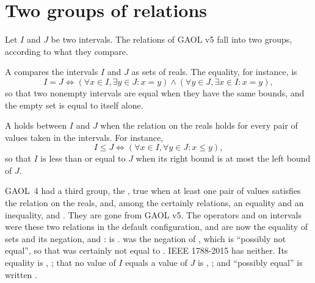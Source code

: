 \section{Two groups of relations}\label{sec:relations-groups}
%

Let $I$ and $J$ be two intervals. The relations of GAOL v5 fall into two
groups, according to what they compare.

\begin{Def}\label{def:relations-set}
A  compares the intervals $I$ and $J$ as sets of reals.
The equality, for instance, is
\begin{equation*}
I=J \Leftrightarrow(\forall x\in I, \exists y\in J\colon x=y)\wedge
                   (\forall y\in J, \exists x\in I\colon x=y),
\end{equation*}
so that two nonempty intervals are equal when they have the same bounds, and
the empty set is equal to itself alone.
\end{Def}

\begin{Def}\label{def:relations-certainly}
A  holds between $I$ and $J$ when the relation on
the reals holds for every pair of values taken in the intervals. For
instance,
\begin{equation*}
I\leq J \Leftrightarrow(\forall x\in I, \forall y\in J\colon x\leq y),
\end{equation*}
so that $I$ is less than or equal to $J$ when its right bound is at most the
left bound of $J$.
\end{Def}

\begin{Rem}\label{rem:relations-possibly}
GAOL~4 had a third group, the , true when at least
one pair of values satisfies the relation on the reals, and, among the certainly
relations, an equality and an inequality,  and
. They are gone
from GAOL v5.\newinvfive{} The operators \code{==} and \code{!=} on intervals
were these two relations in the default configuration, and are now the
equality of sets and its negation,  and :
 is .
 was the negation of
, which is ``possibly not equal'', so that 
was certainly not equal to . IEEE 1788-2015 has neither. Its
equality is , ; that no value of $I$ equals a
value of $J$ is , ; and ``possibly
equal'' is written .
\end{Rem}
%

